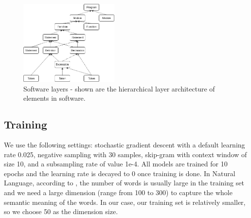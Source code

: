 \begin{table}
	
	
	\caption{Overview of our training data set}
	\label{tab:dataset}
\end{table}
\begin{figure}[t!]
	\includegraphics[width=0.44\textwidth]{software_layers}
	
	\caption{Software layers - shown are the hierarchical layer architecture of elements in software.}
	\label{figure:softwarelayers}
	\medskip
\end{figure}
\subsection{Training}
We use the following settings: stochastic gradient descent with a default learning rate 0.025, negative sampling with 30 samples, skip-gram with context window of size 10, and a subsampling rate of value 1e-4. All models are trained for 10 epochs and the learning rate is decayed to 0 once training is done. In Natural Language, according to \cite{pennington2014glove}, the number of words is usually large in the training set and we need a large dimension (range from 100 to 300) to capture the whole semantic meaning of the words. In our case, our training set is relatively smaller, so we choose 50 as the dimension size.
